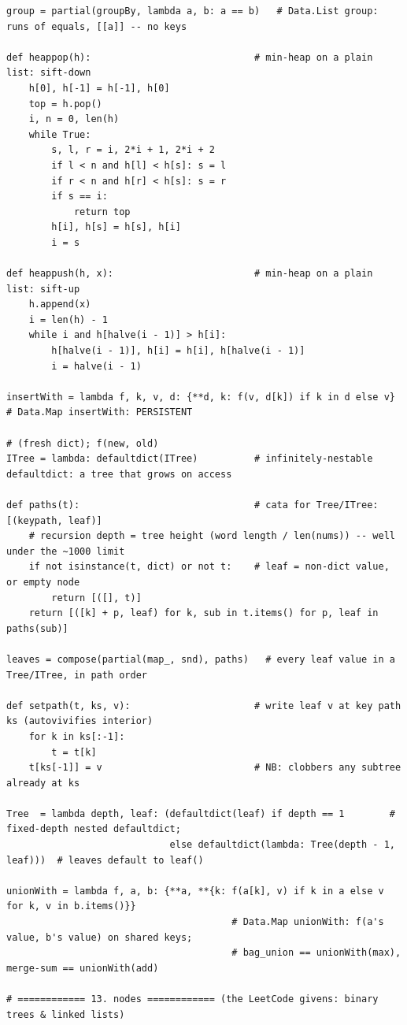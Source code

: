 \documentclass[11pt,letterpaper]{book}
\begin{document}
\begin{lstlisting}[style=file]
group = partial(groupBy, lambda a, b: a == b)   # Data.List group: runs of equals, [[a]] -- no keys

def heappop(h):                             # min-heap on a plain list: sift-down
    h[0], h[-1] = h[-1], h[0]
    top = h.pop()
    i, n = 0, len(h)
    while True:
        s, l, r = i, 2*i + 1, 2*i + 2
        if l < n and h[l] < h[s]: s = l
        if r < n and h[r] < h[s]: s = r
        if s == i:
            return top
        h[i], h[s] = h[s], h[i]
        i = s

def heappush(h, x):                         # min-heap on a plain list: sift-up
    h.append(x)
    i = len(h) - 1
    while i and h[halve(i - 1)] > h[i]:
        h[halve(i - 1)], h[i] = h[i], h[halve(i - 1)]
        i = halve(i - 1)

insertWith = lambda f, k, v, d: {**d, k: f(v, d[k]) if k in d else v}   # Data.Map insertWith: PERSISTENT
                                                                        # (fresh dict); f(new, old)
ITree = lambda: defaultdict(ITree)          # infinitely-nestable defaultdict: a tree that grows on access

def paths(t):                               # cata for Tree/ITree: [(keypath, leaf)]
    # recursion depth = tree height (word length / len(nums)) -- well under the ~1000 limit
    if not isinstance(t, dict) or not t:    # leaf = non-dict value, or empty node
        return [([], t)]
    return [([k] + p, leaf) for k, sub in t.items() for p, leaf in paths(sub)]

leaves = compose(partial(map_, snd), paths)   # every leaf value in a Tree/ITree, in path order

def setpath(t, ks, v):                      # write leaf v at key path ks (autovivifies interior)
    for k in ks[:-1]:
        t = t[k]
    t[ks[-1]] = v                           # NB: clobbers any subtree already at ks

Tree  = lambda depth, leaf: (defaultdict(leaf) if depth == 1        # fixed-depth nested defaultdict;
                             else defaultdict(lambda: Tree(depth - 1, leaf)))  # leaves default to leaf()

unionWith = lambda f, a, b: {**a, **{k: f(a[k], v) if k in a else v for k, v in b.items()}}
                                        # Data.Map unionWith: f(a's value, b's value) on shared keys;
                                        # bag_union == unionWith(max), merge-sum == unionWith(add)

# ============ 13. nodes ============ (the LeetCode givens: binary trees & linked lists)


\end{lstlisting}
\end{document}
